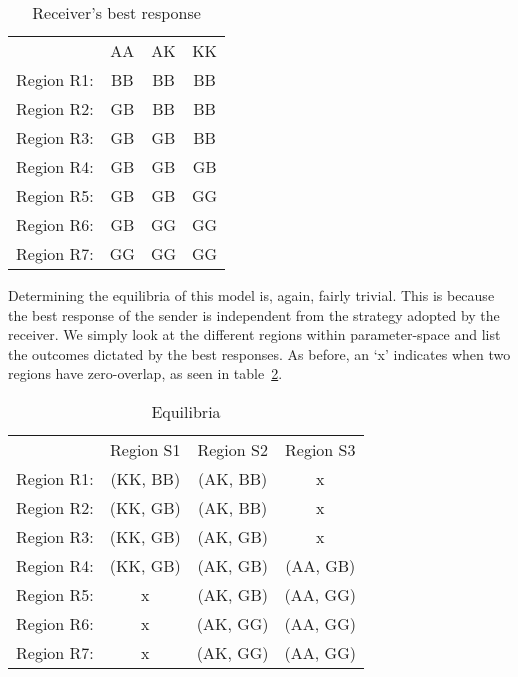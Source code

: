 \documentclass[a4paper,12pt]{article}
\numberwithin{equation}{section}
\begin{document}
\begin{table}[h]
\begin{center}
\begin{tabular}{lccc}
 & AA & AK & KK\\
Region R1: & BB & BB & BB\\
Region R2: & GB & BB & BB\\
Region R3: & GB & GB & BB\\
Region R4: & GB & GB & GB\\
Region R5: & GB & GB & GG\\
Region R6: & GB & GG & GG\\
Region R7: & GG & GG & GG
\end{tabular}
\end{center}
\caption{Receiver's best response}
\label{tab:CueGamewithConditionalAmplification/BestResponseR}
\end{table}

Determining the equilibria of this model is, again, fairly trivial. This is because the best response of the sender is independent from the strategy adopted by the receiver. We simply look at the different regions within parameter-space and list the outcomes dictated by the best responses. As before, an `x' indicates when two regions have zero-overlap, as seen in table~\ref{tab:CueGamewithConditionalAmplification/Equilibria}.

\vspace{-2mm}

\begin{table}[h]
\begin{center}
\begin{tabular}{lccc}
 & Region S1 & Region S2 & Region S3\\
Region R1: & (KK, BB) & (AK, BB) & x\\
Region R2: & (KK, GB) & (AK, BB) & x\\
Region R3: & (KK, GB) & (AK, GB) & x\\
Region R4: & (KK, GB) & (AK, GB) & (AA, GB)\\
Region R5: & x & (AK, GB) & (AA, GG)\\
Region R6: & x & (AK, GG) & (AA, GG)\\
Region R7: & x & (AK, GG) & (AA, GG)
\end{tabular}
\end{center}
\caption{Equilibria}
\label{tab:CueGamewithConditionalAmplification/Equilibria}
\end{table}
\end{document}
